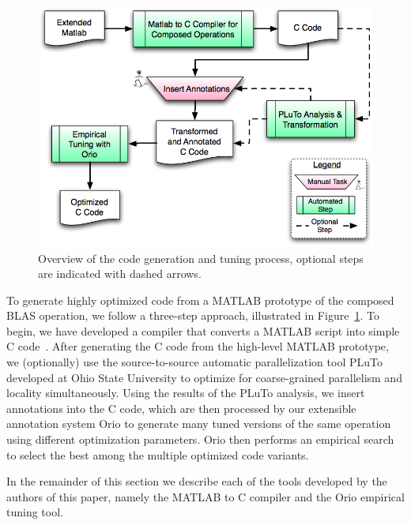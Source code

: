 \documentclass[11pt]{article}
\begin{document}



\begin{figure}[htbp]
\centering
\includegraphics[width=.7\textwidth]{figures/process.png}

\caption{Overview of the code generation and tuning process, optional steps are indicated with dashed arrows.}
\label{fig:process}
\end{figure}
To generate highly optimized code from a MATLAB prototype of the composed BLAS operation, we follow a three-step approach, illustrated in Figure~\ref{fig:process}.  To begin, we have developed a compiler that converts a MATLAB script into simple C code~\cite{Siek}.  After generating the C code from the high-level MATLAB prototype, we (optionally) use the source-to-source automatic parallelization tool PLuTo\cite{Pluto} developed at Ohio State University to optimize for coarse-grained parallelism and locality simultaneously. Using the results of the PLuTo analysis, we insert annotations into the C code, which are then processed by our extensible annotation system Orio to generate many tuned versions of the same operation using different optimization parameters. Orio then performs an empirical search to select the best among the multiple optimized code variants.


In the remainder of this section we describe each of the tools developed by the authors of this paper, namely the MATLAB to C compiler and the Orio empirical tuning tool.
\end{document}
